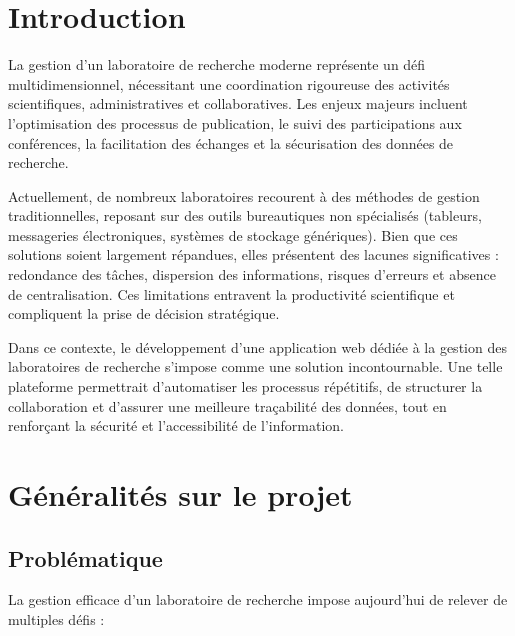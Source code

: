 \documentclass[12pt]{rapportPfe}
\begin{document}
\newpage
\thispagestyle{empty}
\tabledematieres

\newpage
\thispagestyle{empty}
\listoffigures

\newpage
\thispagestyle{empty}
\listoftables

\chapter*{Introduction}

La gestion d’un laboratoire de recherche moderne représente un défi multidimensionnel, nécessitant une coordination rigoureuse des activités scientifiques, administratives et collaboratives. Les enjeux majeurs incluent l’optimisation des processus de publication, le suivi des participations aux conférences, la facilitation des échanges et la sécurisation des données de recherche.

Actuellement, de nombreux laboratoires recourent à des méthodes de gestion traditionnelles, reposant sur des outils bureautiques non spécialisés (tableurs, messageries électroniques, systèmes de stockage génériques). Bien que ces solutions soient largement répandues, elles présentent des lacunes significatives : redondance des tâches, dispersion des informations, risques d’erreurs et absence de centralisation. Ces limitations entravent la productivité scientifique et compliquent la prise de décision stratégique.

Dans ce contexte, le développement d’une application web dédiée à la gestion des laboratoires de recherche s’impose comme une solution incontournable. Une telle plateforme permettrait d’automatiser les processus répétitifs, de structurer la collaboration et d’assurer une meilleure traçabilité des données, tout en renforçant la sécurité et l’accessibilité de l’information.



\chapter{Généralités sur le projet}

\section{Problématique}
La gestion efficace d’un laboratoire de recherche impose aujourd’hui de relever de multiples défis :
\end{document}
